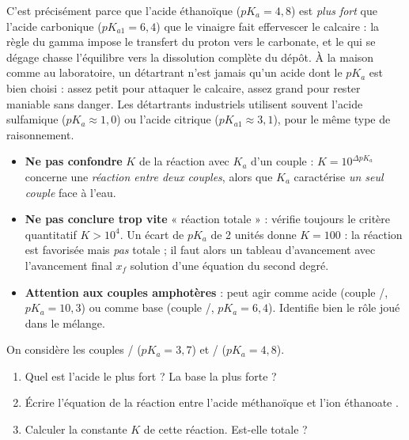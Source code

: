 \documentclass[11pt]{article}
\begin{document}
\begin{savaistu}
C'est précisément parce que l'acide éthanoïque ($pK_a = 4,8$) est \emph{plus fort} que l'acide carbonique ($pK_{a1} = 6,4$) que le vinaigre fait effervescer le calcaire : la règle du gamma impose le transfert du proton vers le carbonate, et le  qui se dégage chasse l'équilibre vers la dissolution complète du dépôt. À la maison comme au laboratoire, un détartrant n'est jamais qu'un acide dont le $pK_a$ est bien choisi : assez petit pour attaquer le calcaire, assez grand pour rester maniable sans danger. Les détartrants industriels utilisent souvent l'acide sulfamique ($pK_a \approx 1,0$) ou l'acide citrique ($pK_{a1} \approx 3,1$), pour le même type de raisonnement.
\end{savaistu}

\begin{attention}
\begin{itemize}
\item \textbf{Ne pas confondre} $K$ de la réaction avec $K_a$ d'un couple : $K = 10^{\Delta pK_a}$ concerne une \emph{réaction entre deux couples}, alors que $K_a$ caractérise \emph{un seul couple} face à l'eau.
\item \textbf{Ne pas conclure trop vite} « réaction totale » : vérifie toujours le critère quantitatif $K > 10^{4}$. Un écart de $pK_a$ de 2 unités donne $K = 100$ : la réaction est favorisée mais \emph{pas} totale ; il faut alors un tableau d'avancement avec l'avancement final $x_f$ solution d'une équation du second degré.
\item \textbf{Attention aux couples amphotères} :  peut agir comme acide (couple /, $pK_a = 10,3$) ou comme base (couple /, $pK_a = 6,4$). Identifie bien le rôle joué dans le mélange.
\end{itemize}
\end{attention}

\begin{exercice}
On considère les couples / ($pK_a = 3,7$) et / ($pK_a = 4,8$).
\begin{enumerate}
\item Quel est l'acide le plus fort ? La base la plus forte ?
\item Écrire l'équation de la réaction entre l'acide méthanoïque  et l'ion éthanoate .
\item Calculer la constante $K$ de cette réaction. Est-elle totale ?
\end{enumerate}
\end{exercice}
\end{document}
